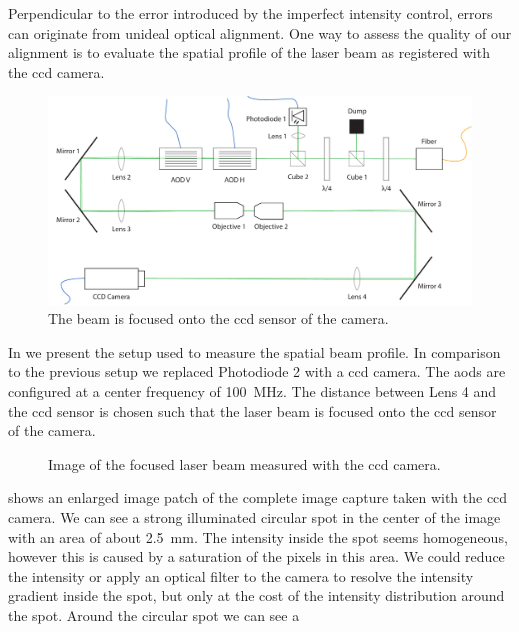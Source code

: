 Perpendicular to the error introduced by the imperfect intensity control,
errors can originate from unideal optical alignment. One way to assess the
quality of our alignment is to evaluate the spatial profile of the laser beam
as registered with the \gls{ccd} camera.
\begin{figure}[htb]
  \centering
  \includegraphics[width=\textwidth]{../media/setup/intensity-profile.pdf}
  \caption{The beam is focused onto the \gls{ccd} sensor of the camera.
  }\label{fig:intensity_profile_setup}
\end{figure}
In  we present the setup used to measure
the spatial beam profile. In comparison to the previous setup we replaced
Photodiode 2 with a \gls{ccd} camera. The \gls{aod}s are configured at a
center frequency of \SI{100}{\mega\hertz}. The distance between Lens 4 and
the \gls{ccd} sensor is chosen such that the laser beam is focused onto the
\gls{ccd} sensor of the camera.
\begin{figure}[htb]
  \centering
  \begin{adjustbox}{width=\textwidth}
  \end{adjustbox}
  \caption{Image of the focused laser beam measured with the \gls{ccd} camera.
  }\label{fig:intensity_spatial_image}
\end{figure}
 shows an enlarged image patch of the
complete image capture taken with the \gls{ccd} camera. We can see a strong
illuminated circular spot in the center of the image with an area of about
\SI{2.5}{\milli\meter}. The intensity inside the spot seems homogeneous,
however this is caused by a saturation of the pixels in this area. We could
reduce the intensity or apply an optical filter to the camera to resolve the
intensity gradient inside the spot, but only at the cost of the intensity
distribution around the spot. Around the circular spot we can see a
